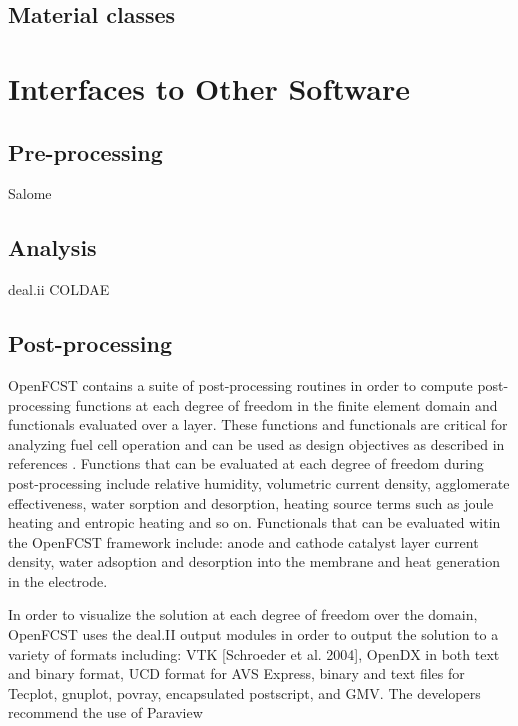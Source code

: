 \documentclass[]{elsart}
\begin{document}
\subsection{Material classes}

\section{Interfaces to Other Software}

\subsection{Pre-processing}
Salome

\subsection{Analysis}

deal.ii
COLDAE

\subsection{Post-processing}
OpenFCST contains a suite of post-processing routines in order to compute post-processing functions at each degree of freedom in the finite element domain and functionals evaluated over a layer. These functions and functionals are critical for analyzing fuel cell operation and can be used as design objectives as described in references \cite{Secanell07a,Secanell07b,Secanell07c}. Functions that can be evaluated at each degree of freedom during post-processing include relative humidity, volumetric current density, agglomerate effectiveness, water sorption and desorption, heating source terms such as joule heating and entropic heating and so on. Functionals that can be evaluated witin the OpenFCST framework include: anode and cathode catalyst layer current density, water adsoption and desorption into the membrane and heat generation in the electrode.

In order to visualize the solution at each degree of freedom over the domain, OpenFCST uses the deal.II output modules in order to output the solution to a variety of formats including: VTK [Schroeder et al. 2004], OpenDX in both text and binary format, UCD format for AVS Express, binary and text files for Tecplot, gnuplot, povray, encapsulated postscript, and GMV. The developers recommend the use of Paraview
\end{document}
